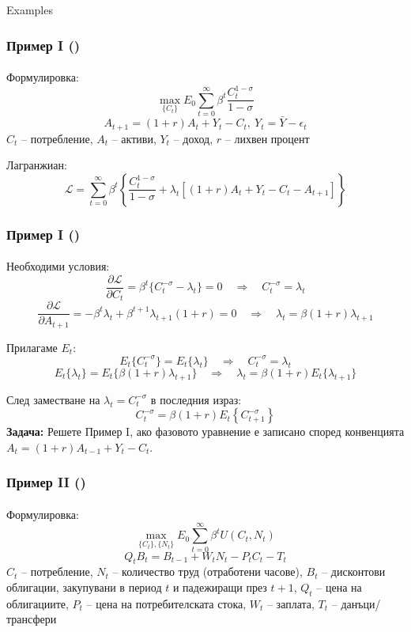 \documentclass[10pt]{beamer}
\theoremstyle{definition}
\begin{document}
\begin{section}{Examples}\label{sec:ex}

\begin{frame}\setcounter{slidenum}{1}
\frametitle{Пример I ()}
\framesubtitle{}
Формулировка:
\[ \max_{\{C_t\}} E_0 \sum_{t=0}^{\infty}\beta^t \frac{C_t^{1-\sigma}}{1-\sigma} \]
\[ A_{t+1}=(1+r)A_t + Y_t - C_t,~Y_t=\bar{Y}-\epsilon_t \]
$ C_t $ -- потребление, $ A_t $ -- активи, $ Y_t $ -- доход, $ r $ -- лихвен процент \bigskip

Лагранжиан:\[ \mathcal{L} = \sum_{t=0}^{\infty}\beta^t \left\{\frac{C_t^{1-\sigma}}{1-\sigma}+\lambda_t \left[(1+r)A_t + Y_t - C_t - A_{t+1}\right] \right\} \]
\end{frame}




\begin{frame}
\frametitle{Пример I ()}
\framesubtitle{}
Необходими условия:
\[ \frac{\partial \mathcal{L} }{\partial C_t} = \beta^t \{C_t^{-\sigma}-\lambda_t\} = 0 \quad\Longrightarrow\quad C_t^{-\sigma}=\lambda_t \]
\[ \frac{\partial \mathcal{L} }{\partial A_{t+1}} = -\beta^t \lambda_t + \beta^{t+1}\lambda_{t+1}(1+r) = 0 \quad\Longrightarrow\quad \lambda_t = \beta(1+r)\lambda_{t+1} \]

Прилагаме $ E_t $:
\[ E_t \{C_t^{-\sigma}\}=E_t \{\lambda_t\} \quad\Longrightarrow\quad C_t^{-\sigma}=\lambda_t \]
\[ E_t \{\lambda_t\} = E_t\{\beta(1+r)\lambda_{t+1}\} \quad\Longrightarrow\quad \lambda_t = \beta(1+r)E_t\{\lambda_{t+1}\} \]

След заместване на $ \lambda_t = C_t^{-\sigma} $ в последния израз:
\[ C_t^{-\sigma} = \beta (1+r)E_t \left\{C_{t+1}^{-\sigma}\right\} \] \pause
\textbf{Задача:} Решете Пример I, ако фазовото уравнение е записано според конвенцията $A_{t}=(1+r)A_{t-1} + Y_t - C_t$.
\end{frame}


\begin{frame}\setcounter{slidenum}{1}
\frametitle{Пример II ()}
\framesubtitle{}
Формулировка:
\[ \max_{\{C_t\},\{N_t\}} E_0 \sum_{t=0}^{\infty}\beta^t U(C_t,N_t) \]
\[ Q_t B_t = B_{t-1} + W_t N_t - P_t C_t - T_t  \]
$ C_t $ -- потребление, $ N_t $ -- количество труд (отработени часове), $ B_t $ -- дисконтови облигации, закупувани в период $ t $ и падежиращи през $ t+1 $, $ Q_t $ -- цена на облигациите, $ P_t $ -- цена на потребителската стока, $ W_t $ -- заплата, $ T_t $ -- данъци/трансфери \bigskip


\end{frame}
\end{section}
\end{document}
